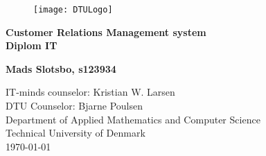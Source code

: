 


  \frontmatter
  \begin{figure}[t!]
    \hspace{8cm}
    \texttt{[image: DTULogo]}
  \end{figure}

  \thispagestyle{empty} %
    \hspace{6cm} \vspace{0cm}
    \begin{center}
    \textbf{
      \Huge {Customer Relations Management system}\\ \vspace{1cm}
      \huge{Diplom IT}
    }
    \end{center}
    \vspace{3cm}
    \begin{center}
    \Large{\textbf{Mads Slotsbo, s123934}}
    \end{center}
    \vspace{4.0cm}
    IT-minds counselor: Kristian W. Larsen\\
    DTU Counselor: Bjarne Poulsen\\
    Department of Applied Mathematics and Computer Science\\
    Technical University of Denmark\\
    \today

  
  \listoftodos{}

  \tableofcontents
  \listoffigures                      %
	\mainmatter{}

  

  
  
  
  
  

  \appendix
  
  
  
  

  \backmatter{}
  \printbibliography{}

